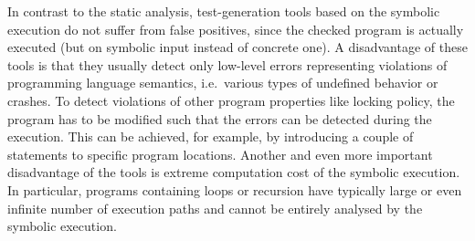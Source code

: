 In contrast to the static analysis, test-generation tools based on the
symbolic execution do not suffer from false positives, since the checked
program is actually executed (but on symbolic input instead of concrete one).
A disadvantage of these tools is that they usually detect only low-level
errors representing violations of programming language semantics, i.e.\ 
various types of undefined behavior or crashes. To detect violations of other
program properties like locking policy, the program has to be modified such
that the errors can be detected during the execution. This can be achieved,
for example, by introducing a couple of \code{assert()} statements to specific
program locations.  Another and even more important disadvantage of the tools
is extreme computation cost of the symbolic execution. In particular, programs
containing loops or recursion have typically large or even infinite number of
execution paths and cannot be entirely analysed by the symbolic execution.

